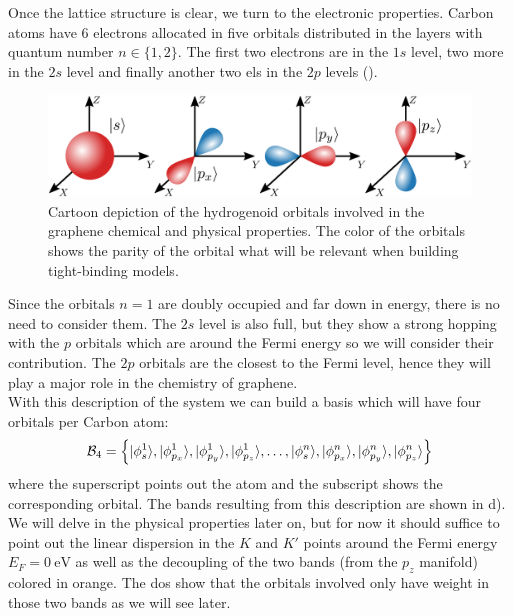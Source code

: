 Once the lattice structure is clear, we turn to the electronic properties. Carbon atoms have 6 electrons allocated in five orbitals distributed in the layers with quantum number $n\in\{1,2\}$.
The first two electrons are in the $1s$ level, two more in the $2s$ level and finally another two \acp{el} in the $2p$ levels ().
\begin{figure}[h!]
\centering
\includegraphics{graphene/figures/orbitals.pdf}
\vspace{-5pt}
\caption{Cartoon depiction of the hydrogenoid orbitals involved in the graphene chemical and physical properties. The color of the orbitals shows the parity of the orbital what will be relevant when building tight-binding models.}
\label{orbitals}
\end{figure}
\FloatBarrier
Since the orbitals $n=1$ are doubly occupied and far down in energy, there is no need to consider them. The $2s$ level is also full, but they show a strong hopping with the $p$ orbitals which are around the Fermi energy so we will consider their contribution. The $2p$ orbitals are the closest to the Fermi level, hence they will play a major role in the chemistry of graphene.\\

With this description of the system we can build a basis which will have four orbitals per Carbon atom:
\begin{equation}
  \mathcal{B}_4 = \left\{
  |\phi^1_{s}\rangle,|\phi^1_{p_x}\rangle,|\phi^1_{p_y}\rangle,|\phi^1_{p_z}\rangle,
  \dots,
  |\phi^n_{s}\rangle,|\phi^n_{p_x}\rangle,|\phi^n_{p_y}\rangle,|\phi^n_{p_z}\rangle
  \right\}
\label{basis4}
\end{equation}
where the superscript points out the atom and the subscript shows the corresponding orbital. The bands resulting from this description are shown in d). We will delve in the physical properties later on, but for now it should suffice to point out the linear dispersion in the $K$ and $K'$ points around the Fermi energy $E_F=\SI{0}{\eV}$ as well as the decoupling of the two bands (from the $p_z$ manifold) colored in orange. The \ac{dos} show that the orbitals involved only have weight in those two bands as we will see later.

